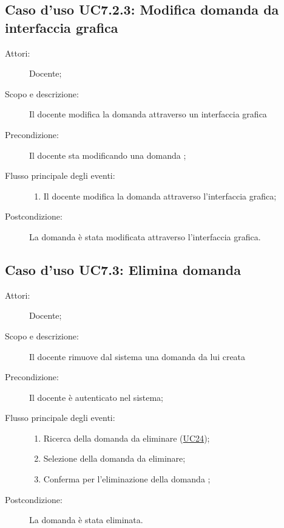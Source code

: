 \subsection{Caso d'uso UC7.2.3: Modifica domanda da interfaccia grafica}\begin{description}
\item[Attori:] Docente;
\item[Scopo e descrizione:] Il docente modifica la domanda attraverso un interfaccia grafica

      \item[Precondizione:] Il docente sta modificando una domanda
;

        \item[Flusso principale degli eventi:] \begin{enumerate}
          \item Il docente modifica la domanda attraverso l'interfaccia grafica;

      \end{enumerate}
    \item[Postcondizione:] La domanda è stata modificata attraverso l'interfaccia grafica.
  \end{description}
\hypertarget{UC7.3}{}
\subsection{Caso d'uso UC7.3: Elimina domanda}\begin{description}
\item[Attori:] Docente;
\item[Scopo e descrizione:] Il docente rimuove dal sistema una domanda da lui creata
      \item[Precondizione:] Il docente è autenticato nel sistema;

        \item[Flusso principale degli eventi:] \begin{enumerate}
          \item Ricerca della domanda da eliminare (\hyperlink{UC24}{UC24});
          \item Selezione della domanda da eliminare;
          \item Conferma per l'eliminazione della domanda	;

      \end{enumerate}
    \item[Postcondizione:] La domanda è stata eliminata.
  \end{description}
\hypertarget{UC7.4}{}
